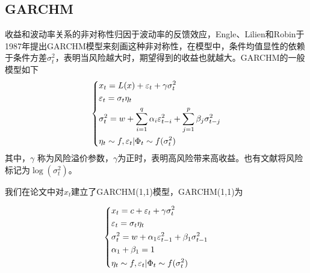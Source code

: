     \subsection{GARCHM}
        收益和波动率关系的非对称性归因于波动率的反馈效应，Engle、Lilien和Robin于1987年提出GARCHM模型来刻画这种非对称性，在模型中，条件均值显性的依赖于条件方差$\sigma_t^2$，表明当风险越大时，期望得到的收益也就越大。GARCHM的一般模型如下
        \begin{equation*}
        \centering
        \left\{\begin{lgathered}
        {x_t} = L(x) + {\varepsilon _t} + \gamma \sigma _t^2\\
        {\varepsilon _t} = {\sigma _t}{\eta _t}\\
        \sigma _t^2 = w + \sum\limits_{i = 1}^q {{\alpha _i}\varepsilon _{t - i}^2}  + \sum\limits_{j = 1}^p {{\beta _j}\sigma _{t - j}^2} \\
        {\eta _t} \sim f,{\varepsilon _t}|{\Phi _t} \sim f(\sigma _t^2)
        \end{lgathered} \right.
        \end{equation*}
        其中，$\gamma$ 称为风险溢价参数，$\gamma $为正时，表明高风险带来高收益。也有文献将风险标记为$\log⁡(\sigma_t^2)$。

        我们在论文中对$x_t$建立了GARCHM(1,1)模型，GARCHM(1,1)为

        \begin{equation*}
        \centering
        \left\{\begin{lgathered}
        {x_t} = c + {\varepsilon _t} + \gamma \sigma _t^2\\
        {\varepsilon _t} = {\sigma _t}{\eta _t}\\
        \sigma _t^2 = w + {\alpha _1}\varepsilon _{t - 1}^2 + {\beta _1}\sigma _{t - 1}^2\\
        {\alpha _1} + {\beta _1} = 1\\
        {\eta _t} \sim f,{\varepsilon _t}|{\Phi _t} \sim f(\sigma _t^2)
        \end{lgathered} \right.
        \end{equation*}
